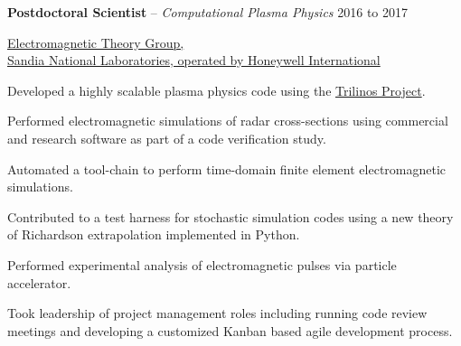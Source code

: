 \documentclass[10pt]{article}
\newenvironment{innerlist}[1][\enskip\textbullet]%
        {\begin{compactitem}[#1]}{\end{compactitem}}
\begin{document}
\textbf{Postdoctoral Scientist} -- \emph{Computational Plasma Physics} \hfill {2016 to 2017}
\begin{innerlist}

\item[] \href{http://www.sandia.gov/}{Electromagnetic Theory Group,\\Sandia National Laboratories, operated by Honeywell International}
\begin{innerlist}
\item Developed a highly scalable plasma physics code using the \href{https://trilinos.org/}{Trilinos Project}.
\item Performed electromagnetic simulations of radar cross-sections using commercial and research software as part of a code verification study.
\item Automated a tool-chain to perform time-domain finite element electromagnetic simulations.
\item Contributed to a test harness for stochastic simulation codes using a new theory of Richardson extrapolation implemented in Python.
\item Performed experimental analysis of electromagnetic pulses via particle accelerator.
\item Took leadership of project management roles including running code review meetings and developing a customized Kanban based agile development process.
\end{innerlist}
\end{innerlist}

\bigskip
\end{document}
